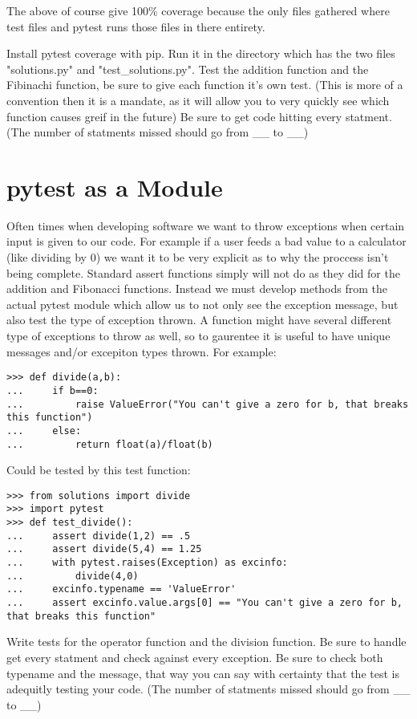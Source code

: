 The above of course give 100\% coverage because the only files gathered where test files and pytest runs those files in there entirety.

\begin{problem}
Install pytest coverage with pip.
Run it in the directory which has the two files "solutions.py" and "test\_solutions.py".
Test the addition function and the Fibinachi function, be sure to give each function it's own test. (This is more of a convention then it is a mandate,
as it will allow you to very quickly see which function causes greif in the future) Be sure to get code hitting every statment.
(The number of statments missed should go from \_\_ to \_\_)
\end{problem}

\section*{pytest as a Module}

Often times when developing software we want to throw exceptions when certain input is given to our code.
For example if a user feeds a bad value to a calculator (like dividing by 0) we want it to be very explicit as to why the proccess isn't being complete.
Standard assert functions simply will not do as they did for the addition and Fibonacci functions.
Instead we must develop methods from the actual pytest module which allow us to not only see the exception message, but also test the type of exception thrown.
A function might have several different type of exceptions to throw as well, so to gaurentee it is useful to have unique messages and/or excepiton types thrown.
For example:

\begin{lstlisting}
>>> def divide(a,b):
...     if b==0:
...         raise ValueError("You can't give a zero for b, that breaks this function")
...     else:
...         return float(a)/float(b)
\end{lstlisting}
Could be tested by this test function:
\begin{lstlisting}
>>> from solutions import divide
>>> import pytest
>>> def test_divide():
...     assert divide(1,2) == .5
...     assert divide(5,4) == 1.25
...     with pytest.raises(Exception) as excinfo:
...         divide(4,0)
...     excinfo.typename == 'ValueError'
...     assert excinfo.value.args[0] == "You can't give a zero for b, that breaks this function"
\end{lstlisting}

\begin{problem}
Write tests for the operator function and the division function. Be sure to handle get every statment and check against every exception.
Be sure to check both typename and the message, that way you can say with certainty that the test is adequitly testing your code.
(The number of statments missed should go from \_\_ to \_\_)
\end{problem}

